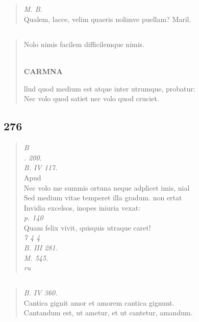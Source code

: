 \documentclass[11pt, a4paper]{report}
\begin{document}
            \subsection*{}
      \begin{verse}
      \textit{M. B.} \\ Qualem, lacce, velim quaeris nolimve puellam? Maril. \\ 
      \end{verse}
  
            \subsection*{}
      \begin{verse}
      Nolo nimis facilem difficilemque nimis. \\ 
        ﻿\pagebreak 
    \begin{center} \textbf{CARMNA} \end{center} \marginpar{[218]} llud quod medium est atque inter utrumque, probatur: \\ Nec volo quod satiet nec volo quod cruciet. \\ 
      \end{verse}
  
            \subsection*{276}
      \begin{verse}
      \textit{B} \\ \textit{. 200.} \\ \textit{B. IV 117.} \\ Apud \\ Nec volo me summis ortuna neque adplicet imis, nial \\ Sed medium vitae temperet illa gradum. non ertat \\ Invidia excelsos, inopes iniuria vexat: \\ \textit{p. 140} \\ Quam felix vivit, quisquis utraque caret! \\ \textit{7 4 4} \\ \textit{B. III 281.} \\ \textit{M. 545.} \\ \textit{ru} \\ 
      \end{verse}
  
            \subsection*{}
      \begin{verse}
      \textit{B. IV 360.} \\ Cantica gignit amor et amorem cantica gignunt. \\ Cantandum est, ut ametur, et ut cantetur, amandum. \\ 
      \end{verse}
  
\end{document}
